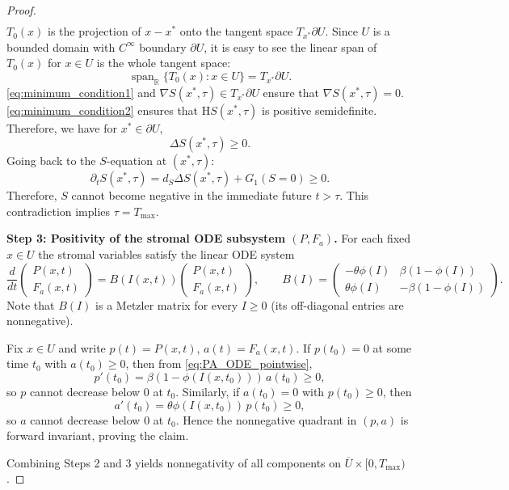 \documentclass[pdflatex,sn-mathphys-ay]{sn-jnl}
\theoremstyle{thmstyleone}
\theoremstyle{definition}
\theoremstyle{remark}
\begin{document}
\begin{proof}
\begin{align*}
\end{align*}
$T_0(x)$ is the projection of $x-x^*$ onto the tangent space $T_{x^*}\partial U$. Since $U$ is a bounded domain with $C^\infty$ boundary $\partial U$, it is easy to see the linear span of $T_0(x)$ for $x\in U$ is the whole tangent space:
\begin{equation*}
    \operatorname{span}_{\mathbb{R}} \{T_0(x): x\in U\} = T_{x^*}\partial U.
\end{equation*}
\eqref{eq:minimum_condition1} and $\nabla S(x^*,\tau)\in T_{x^*}\partial U$ ensure that $\nabla S(x^*,\tau) = 0$. \eqref{eq:minimum_condition2} ensures that $\mathrm{H}S(x^*,\tau)$ is positive semidefinite. Therefore, we have for $x^*\in \partial U$,
\[
\Delta S(x^*,\tau) \ge 0.
\]
Going back to the $S$-equation at $(x^*,\tau)$:
\[
\partial_t S(x^*,\tau) = d_S\Delta S(x^*,\tau) + G_1(S = 0) \ge 0.
\]
Therefore, $S$ cannot become negative in the immediate future $t>\tau$. This contradiction implies $\tau=T_{\max}$.

\smallskip
\noindent\textbf{Step 3: Positivity of the stromal ODE subsystem $(P,F_a)$.}
For each fixed $x\in U$ the stromal variables satisfy the linear ODE system
\begin{equation}\label{eq:PA_ODE_pointwise}
\frac{d}{dt}
\begin{pmatrix}
P(x,t)\\ F_a(x,t)
\end{pmatrix}
=
B(I(x,t))
\begin{pmatrix}
P(x,t)\\ F_a(x,t)
\end{pmatrix},
\qquad
B(I)=
\begin{pmatrix}
-\theta\phi(I) & \beta(1-\phi(I))\\
\theta\phi(I) & -\beta(1-\phi(I))
\end{pmatrix}.
\end{equation}
Note that $B(I)$ is a Metzler matrix for every $I\ge0$ (its off-diagonal entries are nonnegative).

Fix $x\in U$ and write $p(t)=P(x,t)$, $a(t)=F_a(x,t)$.
If $p(t_0)=0$ at some time $t_0$ with $a(t_0)\ge0$, then from \eqref{eq:PA_ODE_pointwise},
\[
p'(t_0)=\beta(1-\phi(I(x,t_0)))\,a(t_0)\ge 0,
\]
so $p$ cannot decrease below $0$ at $t_0$.
Similarly, if $a(t_0)=0$ with $p(t_0)\ge0$, then
\[
a'(t_0)=\theta\phi(I(x,t_0))\,p(t_0)\ge 0,
\]
so $a$ cannot decrease below $0$ at $t_0$.
Hence the nonnegative quadrant in $(p,a)$ is forward invariant, proving the claim.

Combining Steps 2 and 3 yields nonnegativity of all components on $\overline U\times[0,T_{\max})$.
\end{proof}
\end{document}
